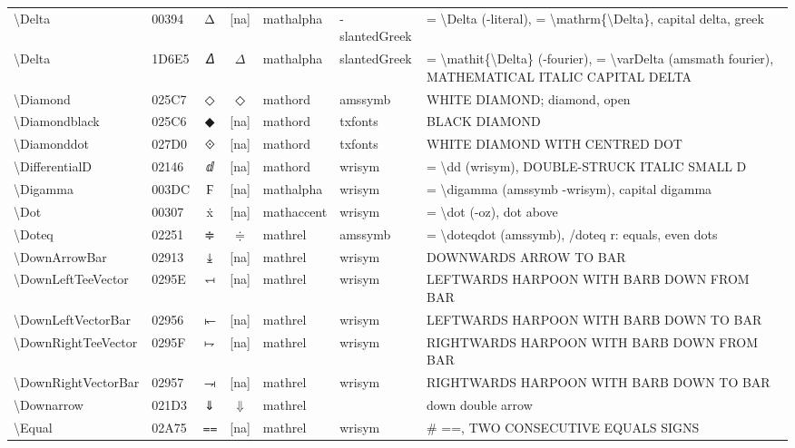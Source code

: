 \documentclass[a4paper,landscape]{article}
\begin{document}
\begin{longtable}{llcclll}
\textbackslash{}Delta & 00394 & Δ & [na] & mathalpha & -slantedGreek & = \textbackslash{}Delta (-literal),  = \textbackslash{}mathrm\{\textbackslash{}Delta\},  capital delta,  greek \\
\textbackslash{}Delta & 1D6E5 & 𝛥 & $\Delta$ & mathalpha & slantedGreek & = \textbackslash{}mathit\{\textbackslash{}Delta\} (-fourier), = \textbackslash{}varDelta (amsmath fourier), MATHEMATICAL ITALIC CAPITAL DELTA \\
\textbackslash{}Diamond & 025C7 & ◇ & $\Diamond$ & mathord & amssymb & WHITE DIAMOND; diamond, open \\
\textbackslash{}Diamondblack & 025C6 & ◆ & [na] & mathord & txfonts & BLACK DIAMOND \\
\textbackslash{}Diamonddot & 027D0 & ⟐ & [na] & mathord & txfonts & WHITE DIAMOND WITH CENTRED DOT \\
\textbackslash{}DifferentialD & 02146 & ⅆ & [na] & mathord & wrisym & = \textbackslash{}dd (wrisym), DOUBLE-STRUCK ITALIC SMALL D \\
\textbackslash{}Digamma & 003DC & Ϝ & [na] & mathalpha & wrisym & = \textbackslash{}digamma (amssymb -wrisym),  capital digamma \\
\textbackslash{}Dot & 00307 & ẋ & [na] & mathaccent & wrisym & = \textbackslash{}dot (-oz),  dot above \\
\textbackslash{}Doteq & 02251 & ≑ & $\Doteq$ & mathrel & amssymb & = \textbackslash{}doteqdot (amssymb), /doteq r: equals, even dots \\
\textbackslash{}DownArrowBar & 02913 & ⤓ & [na] & mathrel & wrisym & DOWNWARDS ARROW TO BAR \\
\textbackslash{}DownLeftTeeVector & 0295E & ⥞ & [na] & mathrel & wrisym & LEFTWARDS HARPOON WITH BARB DOWN FROM BAR \\
\textbackslash{}DownLeftVectorBar & 02956 & ⥖ & [na] & mathrel & wrisym & LEFTWARDS HARPOON WITH BARB DOWN TO BAR \\
\textbackslash{}DownRightTeeVector & 0295F & ⥟ & [na] & mathrel & wrisym & RIGHTWARDS HARPOON WITH BARB DOWN FROM BAR \\
\textbackslash{}DownRightVectorBar & 02957 & ⥗ & [na] & mathrel & wrisym & RIGHTWARDS HARPOON WITH BARB DOWN TO BAR \\
\textbackslash{}Downarrow & 021D3 & ⇓ & $\Downarrow$ & mathrel &  & down double arrow \\
\textbackslash{}Equal & 02A75 & ⩵ & [na] & mathrel & wrisym & \# ==, TWO CONSECUTIVE EQUALS SIGNS \\

\end{longtable}
\end{document}
